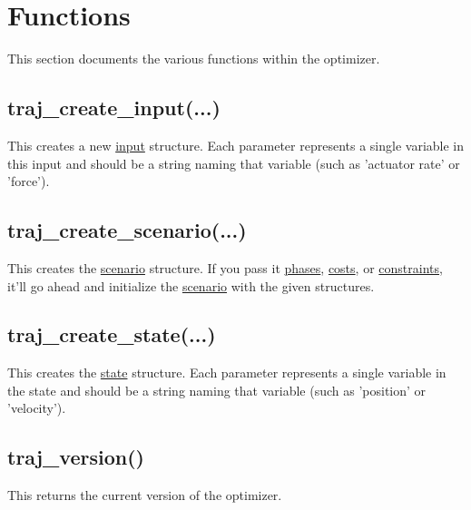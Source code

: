 \documentclass{article}
\begin{document}
	\section{Functions}
		This section documents the various functions within the optimizer.

		\subsection{traj\_create\_input(...)}
			This creates a new \hyperref[sec:input]{input} structure. Each parameter represents a single variable in this input
			and should be a string naming that variable (such as 'actuator rate' or 'force').

		\subsection{traj\_create\_scenario(...)}
			This creates the \hyperref[sec:scenario]{scenario} structure. If you pass it \hyperref[sec:phase]{phases},
			\hyperref[sec:cost]{costs}, or \hyperref[sec:constraint]{constraints}, it'll go ahead and
			initialize the \hyperref[sec:scenario]{scenario} with the given structures.

		\subsection{traj\_create\_state(...)}
			This creates the \hyperref[sec:state]{state} structure. Each parameter represents a single variable in the state
			and should be a string naming that variable (such as 'position' or 'velocity').

		\subsection{traj\_version()}
			This returns the current version of the optimizer.
\end{document}
